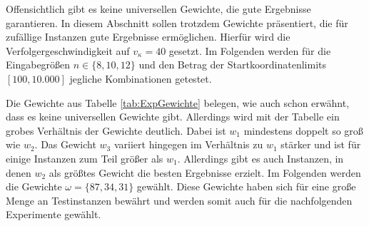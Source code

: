 \documentclass[german,version-2019-11]{uzl-thesis}
\begin{document}
Offensichtlich gibt es keine universellen Gewichte, die gute Ergebnisse garantieren. In diesem Abschnitt sollen trotzdem Gewichte präsentiert, die für zufällige Instanzen gute Ergebnisse ermöglichen. Hierfür wird die Verfolgergeschwindigkeit auf $v_{\kappa}=40$ gesetzt. Im Folgenden  werden für die Eingabegrößen $n\in\{8,10,12\}$ und den Betrag der Startkoordinatenlimits $[100,10.000]$ jegliche Kombinationen getestet. 
\begin{table}[htpb]
\centering
{}
\caption{Der jeweils beste Gewichte-Kandidat von $1.000$ zufälligen Gewichten für $100$ zufällige Instanzen.}
\label{tab:ExpGewichte}
\end{table} 
\noindent
Die Gewichte aus Tabelle \ref{tab:ExpGewichte} belegen, wie auch schon erwähnt, dass es keine universellen Gewichte gibt. Allerdings wird mit der Tabelle ein grobes Verhältnis der Gewichte deutlich. Dabei ist $w_1$ mindestens doppelt so groß wie $w_2$. Das Gewicht $w_3$ variiert hingegen im Verhältnis zu $w_1$ stärker und ist für einige Instanzen zum Teil größer als $w_1$. Allerdings gibt es auch Instanzen, in denen $w_2$ als größtes Gewicht die besten Ergebnisse erzielt. Im Folgenden werden die Gewichte $\omega = \{87,34,31\}$ gewählt. Diese Gewichte haben sich für eine große Menge an Testinstanzen bewährt und werden somit auch für die nachfolgenden Experimente gewählt.
\end{document}
